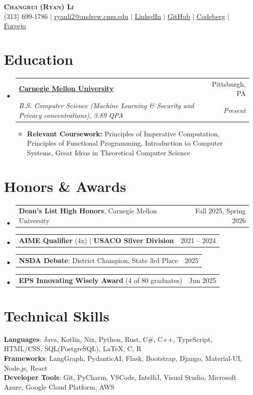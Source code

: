 \documentclass[letterpaper,11pt]{article}
\makeatletter
\newcommand{\resumeSubheading}[4]{
  \vspace{-2pt}\item
    \begin{tabular*}{0.97\textwidth}[t]{l@{\extracolsep{\fill}}r}
      \textbf{#1} & #2 \\
      \textit{\small#3} & \textit{\small #4} \\
    \end{tabular*}\vspace{-7pt}
}
\newcommand{\resumeAwardHeading}[2]{
    \item
    \begin{tabular*}{0.97\textwidth}{l@{\extracolsep{\fill}}r}
      \small#1 & #2 \\
    \end{tabular*}\vspace{-7pt}
}
\newcommand{\resumeSubHeadingListStart}{\begin{itemize}[leftmargin=0.15in, label={}]}
\newcommand{\resumeSubHeadingListEnd}{\end{itemize}}
\newcommand{\resumeItemListStart}{\begin{itemize}}
\newcommand{\resumeItemListEnd}{\end{itemize}\vspace{-5pt}}
\makeatother
\begin{document}
\begin{center}
    \textbf{\Huge \scshape Changrui (Ryan) Li} \\ \vspace{1pt}
    \small (313) 699-1786 $|$ \href{mailto:ryanli2@andrew.cmu.edu}{\underline{ryanli2@andrew.cmu.edu}} $|$ \href{https://www.linkedin.com/in/ryan-li-ab139919b/}{\underline{LinkedIn}} $|$
    \href{https://github.com/thesuperRL}{\underline{GitHub}} $|$
    \href{https://codeberg.org/thesuperRL}{\underline{Codeberg}} $|$
    \href{https://git.cmu.dev/thesuperRL}{\underline{Forgejo}}
\end{center}

\section{Education}
  \resumeSubHeadingListStart
      \resumeSubheading
              {\href{https://www.cmu.edu/}{\underline{Carnegie Mellon University}} }{Pittsburgh, PA}
              {B.S. Computer Science (Machine Learning \& Security and Privacy concentrations), 3.89 QPA}{Present}
              \resumeItemListStart
                  \item{
                    \textbf{Relevant Coursework:} Principles of Imperative Computation, Principles of Functional Programming, Introduction to Computer Systems, Great Ideas in Theoretical Computer Science
                    }
              \resumeItemListEnd
  \resumeSubHeadingListEnd

\section{Honors \& Awards}
  \resumeSubHeadingListStart
    \resumeAwardHeading{\textbf{Dean's List High Honors}, Carnegie Mellon University}{Fall 2025, Spring 2026}
    \resumeAwardHeading{\textbf{AIME Qualifier} (4x) $|$ \textbf{USACO Silver Division}}{2021 -- 2024}
    \resumeAwardHeading{\textbf{NSDA Debate}: District Champion, State 3rd Place}{2025}
    \resumeAwardHeading{\textbf{EPS Innovating Wisely Award} (4 of 80 graduates)}{Jun 2025}
  \resumeSubHeadingListEnd

\section{Technical Skills}
 \begin{itemize}[leftmargin=0.15in, label={}]
    \small{\item{
     \textbf{Languages}{: Java, Kotlin, Nix, Python, Rust, C\#, C++, TypeScript, HTML/CSS, SQL(PostgreSQL), \LaTeX, C, R} \\
     \textbf{Frameworks}{: LangGraph, PydanticAI, Flask, Bootstrap, Django, Material-UI, Node.js, React} \\
     \textbf{Developer Tools}{: Git, PyCharm, VSCode, IntelliJ, Visual Studio, Microsoft Azure, Google Cloud Platform, AWS} \\
    }}
 \end{itemize}
\end{document}
